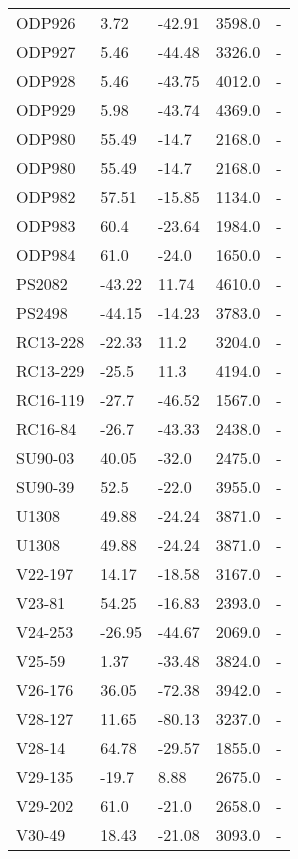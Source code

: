 \begin{longtable}{lllrl}
           ODP926 &     3.72 &    -42.91 &     3598.0 &         - \\
           ODP927 &     5.46 &    -44.48 &     3326.0 &         - \\
           ODP928 &     5.46 &    -43.75 &     4012.0 &         - \\
           ODP929 &     5.98 &    -43.74 &     4369.0 &         - \\
           ODP980 &    55.49 &     -14.7 &     2168.0 &         - \\
           ODP980 &    55.49 &     -14.7 &     2168.0 &         - \\
           ODP982 &    57.51 &    -15.85 &     1134.0 &         - \\
           ODP983 &     60.4 &    -23.64 &     1984.0 &         - \\
           ODP984 &     61.0 &     -24.0 &     1650.0 &         - \\
           PS2082 &   -43.22 &     11.74 &     4610.0 &         - \\
           PS2498 &   -44.15 &    -14.23 &     3783.0 &         - \\
         RC13-228 &   -22.33 &      11.2 &     3204.0 &         - \\
         RC13-229 &    -25.5 &      11.3 &     4194.0 &         - \\
         RC16-119 &    -27.7 &    -46.52 &     1567.0 &         - \\
          RC16-84 &    -26.7 &    -43.33 &     2438.0 &         - \\
          SU90-03 &    40.05 &     -32.0 &     2475.0 &         - \\
          SU90-39 &     52.5 &     -22.0 &     3955.0 &         - \\
            U1308 &    49.88 &    -24.24 &     3871.0 &         - \\
            U1308 &    49.88 &    -24.24 &     3871.0 &         - \\
          V22-197 &    14.17 &    -18.58 &     3167.0 &         - \\
           V23-81 &    54.25 &    -16.83 &     2393.0 &         - \\
          V24-253 &   -26.95 &    -44.67 &     2069.0 &         - \\
           V25-59 &     1.37 &    -33.48 &     3824.0 &         - \\
          V26-176 &    36.05 &    -72.38 &     3942.0 &         - \\
          V28-127 &    11.65 &    -80.13 &     3237.0 &         - \\
           V28-14 &    64.78 &    -29.57 &     1855.0 &         - \\
          V29-135 &    -19.7 &      8.88 &     2675.0 &         - \\
          V29-202 &     61.0 &     -21.0 &     2658.0 &         - \\
           V30-49 &    18.43 &    -21.08 &     3093.0 &         - \\
\end{longtable}
